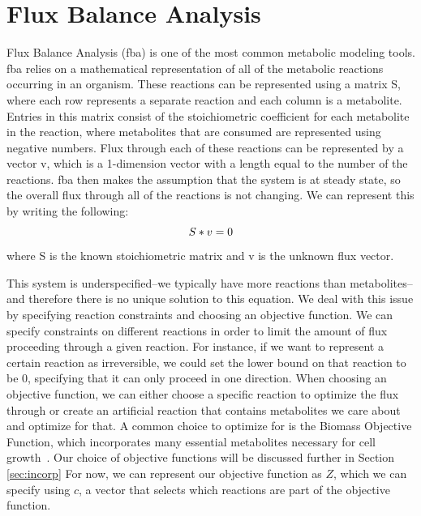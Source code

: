 \section{Flux Balance Analysis}
Flux Balance Analysis (\gls{fba}) is one of the most common metabolic modeling tools.
\gls{fba} relies on a mathematical representation of all of the metabolic reactions occurring in an organism.
These reactions can be represented using a matrix S, where each row represents a separate reaction and each column is a metabolite.
Entries in this matrix consist of the stoichiometric coefficient for each metabolite in the reaction, where metabolites that are consumed are represented using negative numbers.
Flux through each of these reactions can be represented by a vector v, which is a 1-dimension vector with a length equal to the number of the reactions.
\gls{fba} then makes the assumption that the system is at steady state, so the overall flux through all of the reactions is not changing.
We can represent this by writing the following:
\begin{equation}
S * v = 0 \\
\end{equation}
where S is the known stoichiometric matrix and v is the unknown flux vector.

This system is underspecified--we typically have more reactions than metabolites--and therefore there is no unique solution to this equation.
We deal with this issue by specifying reaction constraints and choosing an objective function.
We can specify constraints on different reactions in order to limit the amount of flux proceeding through a given reaction.
For instance, if we want to represent a certain reaction as irreversible, we could set the lower bound on that reaction to be 0, specifying that it can only proceed in one direction.
When choosing an objective function, we can either choose a specific reaction to optimize the flux through or create an artificial reaction that contains metabolites we care about and optimize for that.
A common choice to optimize for is the Biomass Objective Function, which incorporates many essential metabolites necessary for cell growth~\cite{feist2010biomass}.
Our choice of objective functions will be discussed further in Section \ref{sec:incorp}
For now, we can represent our objective function as $Z$, which we can specify using $c$, a vector that selects which reactions are part of the objective function.


